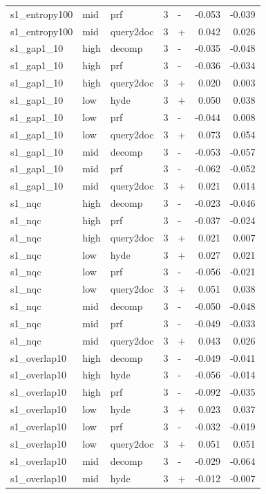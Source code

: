 \begin{table}
\begin{tabular}{lllrlrr}
s1\_entropy100 & mid & prf & 3 & - & -0.053 & -0.039 \\
s1\_entropy100 & mid & query2doc & 3 & + & 0.042 & 0.026 \\
s1\_gap1\_10 & high & decomp & 3 & - & -0.035 & -0.048 \\
s1\_gap1\_10 & high & prf & 3 & - & -0.036 & -0.034 \\
s1\_gap1\_10 & high & query2doc & 3 & + & 0.020 & 0.003 \\
s1\_gap1\_10 & low & hyde & 3 & + & 0.050 & 0.038 \\
s1\_gap1\_10 & low & prf & 3 & - & -0.044 & 0.008 \\
s1\_gap1\_10 & low & query2doc & 3 & + & 0.073 & 0.054 \\
s1\_gap1\_10 & mid & decomp & 3 & - & -0.053 & -0.057 \\
s1\_gap1\_10 & mid & prf & 3 & - & -0.062 & -0.052 \\
s1\_gap1\_10 & mid & query2doc & 3 & + & 0.021 & 0.014 \\
s1\_nqc & high & decomp & 3 & - & -0.023 & -0.046 \\
s1\_nqc & high & prf & 3 & - & -0.037 & -0.024 \\
s1\_nqc & high & query2doc & 3 & + & 0.021 & 0.007 \\
s1\_nqc & low & hyde & 3 & + & 0.027 & 0.021 \\
s1\_nqc & low & prf & 3 & - & -0.056 & -0.021 \\
s1\_nqc & low & query2doc & 3 & + & 0.051 & 0.038 \\
s1\_nqc & mid & decomp & 3 & - & -0.050 & -0.048 \\
s1\_nqc & mid & prf & 3 & - & -0.049 & -0.033 \\
s1\_nqc & mid & query2doc & 3 & + & 0.043 & 0.026 \\
s1\_overlap10 & high & decomp & 3 & - & -0.049 & -0.041 \\
s1\_overlap10 & high & hyde & 3 & - & -0.056 & -0.014 \\
s1\_overlap10 & high & prf & 3 & - & -0.092 & -0.035 \\
s1\_overlap10 & low & hyde & 3 & + & 0.023 & 0.037 \\
s1\_overlap10 & low & prf & 3 & - & -0.032 & -0.019 \\
s1\_overlap10 & low & query2doc & 3 & + & 0.051 & 0.051 \\
s1\_overlap10 & mid & decomp & 3 & - & -0.029 & -0.064 \\
s1\_overlap10 & mid & hyde & 3 & + & -0.012 & -0.007 \\

\end{tabular}
\end{table}
